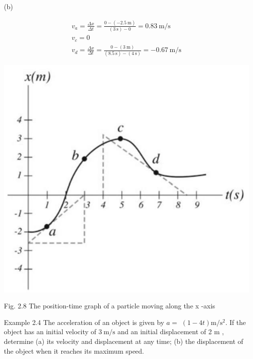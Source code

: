 \documentclass[10pt]{article}
\begin{document}
(b)

$$
\begin{gathered}
v_{a}=\frac{\Delta x}{\Delta t}=\frac{0-(-2.5 \mathrm{~m})}{(3 \mathrm{~s})-0}=0.83 \mathrm{~m} / \mathrm{s} \\
v_{c}=0 \\
v_{d}=\frac{\Delta x}{\Delta t}=\frac{0-(3 \mathrm{~m})}{(8.5 \mathrm{~s})-(4 \mathrm{~s})}=-0.67 \mathrm{~m} / \mathrm{s}
\end{gathered}
$$

\begin{center}
\includegraphics[max width=\textwidth]{2024_09_13_db1f357d2aad0a03eb2eg-030(1)}
\end{center}

Fig. 2.8 The position-time graph of a particle moving along the x -axis

Example 2.4 The acceleration of an object is given by $a=$ $(1-4 t) \mathrm{m} / \mathrm{s}^{2}$. If the object has an initial velocity of $3 \mathrm{~m} / \mathrm{s}$ and an initial displacement of 2 m , determine (a) its velocity and displacement at any time; (b) the displacement of the object when it reaches its maximum speed.
\end{document}
